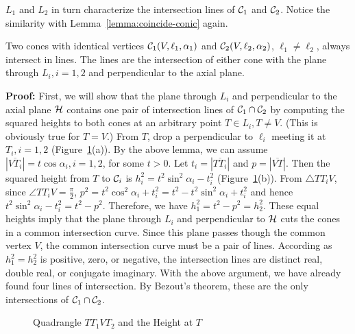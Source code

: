      $L_1$ and $L_2$ in turn characterize the intersection lines of
${\cal C}_1$ and ${\cal C}_2$.
Notice the similarity with Lemma~\ref{lemma:coincide-conic} again.

\begin{theorem}
\label{theorem:linear-intersection}
     Two cones with identical vertices ${\cal C}_1(V,\ell_1,\alpha_1)$ and
${\cal C}_2(V,\ell_2,\alpha_2)$, $\ell_1\neq\ell_2$, always intersect in
lines.  The lines are the intersection of either cone with the plane through
$L_i,i=1,2$ and perpendicular to the axial plane.
\end{theorem}
{\bf Proof:}  First, we will show that the plane through $L_i$ and
perpendicular to the axial plane ${\cal H}$ contains one pair of intersection
lines of ${\cal C}_1\cap{\cal C}_2$ by computing the squared heights to both
cones at an arbitrary point $T\in L_i, T\neq V$. (This is obviously true for
$T=V$.)  From $T$, drop a perpendicular to $\ell_i$ meeting it at $T_i,i=1,2$
(Figure~\ref{fig:quadrilateral}(a)).  By the above lemma, we can assume
$|\overline{VT_i}|=t\cos\!\alpha_i, i=1,2$, for some $t>0$.
Let $t_i=|\overline{TT_i}|$ and $p=|\overline{VT}|$.  Then the squared height
from $T$ to ${\cal C}_i$ is $h_i^2=t^2\sin^2\!\alpha_i-t_i^2$
(Figure~\ref{fig:quadrilateral}(b)).  From $\bigtriangleup TT_iV$, since
$\angle TT_iV=\frac{\pi}{2}$,
$p^2=t^2\cos^2\!\alpha_i+t_i^2=t^2-t^2\sin^2\!\alpha_i+t_i^2$ and hence
$t^2\sin^2\!\alpha_i-t_i^2=t^2-p^2$.  Therefore, we have $h_1^2=t^2-p^2=h_2^2$.
These equal heights imply that the plane through $L_i$ and perpendicular to
${\cal H}$ cuts the cones in a common intersection curve.  Since this plane
passes though the common vertex $V$, the common intersection curve must be
a pair of lines.  According as $h_1^2=h_2^2$ is positive,
zero, or negative, the intersection lines are distinct real, double real, or
conjugate imaginary.  With the above argument, we have already found four
lines of intersection.  By Bezout's theorem, these are the only intersections
of ${\cal C}_1\cap{\cal C}_2$. \QED

\begin{figure}
\vspace{4cm}
\caption{Quadrangle $TT_1VT_2$ and the Height at $T$}
\label{fig:quadrilateral}
\end{figure}

